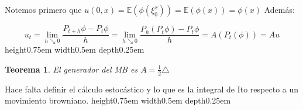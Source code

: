 \documentclass[11pt]{article}
\newtheorem{theorem}{Teorema}[section]
\newenvironment{proof}[1][Demostraci\'on]{\begin{trivlist}
\item[\hskip \labelsep {\bfseries #1}]}{\end{trivlist}}
\newcommand{\qed}{\nobreak \ifvmode \relax \else
      \ifdim\lastskip<1.5em \hskip-\lastskip
      \hskip1.5em plus0em minus0.5em \fi \nobreak
      \vrule height0.75em width0.5em depth0.25em\fi}
\begin{document}
\begin{proof}
Notemos primero que $u(0,x)=\mathbb{E}(\phi(\xi_{0}^{x}))=\mathbb{E}(\phi(x))=\phi(x)$
Adem\'as:

$$u_t = \lim_{h \searrow 0}{\dfrac{P_{t+h}\phi - P_t \phi}{h}} = \lim_{h \searrow 0}{\dfrac{P_h(P_{t}\phi) - P_t \phi}{h}} = A(P_t(\phi))=Au$$\qed

\end{proof}

\begin{theorem}
El generador del MB es $A= \frac{1}{2}\triangle$
\end{theorem}
\begin{proof}
Hace falta definir el c\'alculo estoc\'astico y lo que es la integral de Ito respecto a un movimiento browniano.\qed
\end{proof}
\end{document}

